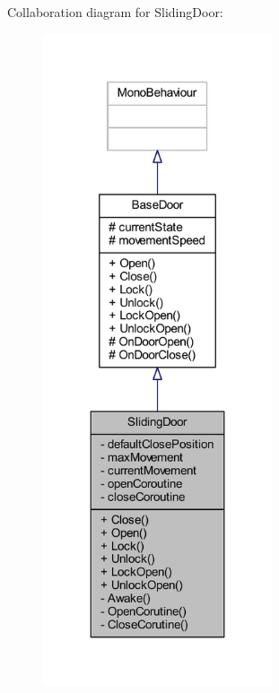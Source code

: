 Collaboration diagram for Sliding\+Door\+:
\nopagebreak
\begin{figure}[H]
\begin{center}
\leavevmode
\includegraphics[width=191pt]{class_sliding_door__coll__graph}
\end{center}
\end{figure}
